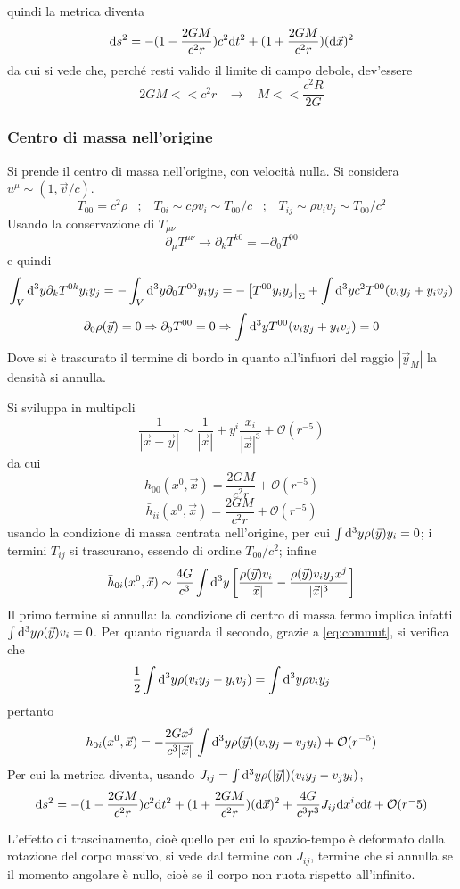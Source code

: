 quindi la metrica diventa
\[ \mathrm{d} s^2 = -(1-\frac{2GM}{c^2r})c^2\mathrm{d} t^2 + (1+\frac{2GM}{c^2r})(\mathrm{d} \vec{x})^2 \]
da cui si vede che, perch\'e resti valido il limite di campo debole, dev'essere
\[ 2GM << c^2r \;\;\;\rightarrow \;\;\; M<<\frac{c^2R}{2G} \]




\subsubsection{Centro di massa nell'origine}
Si prende il centro di massa nell'origine, con velocit\`a nulla. Si considera \( u^\mu \sim (1,\vec{v}/c) \).
\[ T_{00} = c^2\rho \;\;\; ; \;\;\; T_{0i} \sim c\rho v_i \sim T_{00}/c \;\;\; ; \;\;\; T_{ij} \sim \rho v_i v_j\sim T_{00}/c^2 \]
Usando la conservazione di $T_{\mu\nu}$
\[ \partial_\mu T^{\mu\nu} \rightarrow \partial_k T^{k0} = - \partial_0 T^{00} \]
e quindi 
\[ \int_V \mathrm{d}^3y \partial_kT^{0k} y_iy_j = -\int_V \mathrm{d}^3y \partial_0T^{00} y_iy_j  = -\left[ T^{00}y_iy_j\right|_\Sigma + \int \mathrm{d}^3y c^2 T^{00} (v_iy_j + y_iv_j) \]
\begin{equation} \label{eq:commut}
	\partial_0\rho(\vec{y}) = 0 \Rightarrow \partial_0T^{00} = 0 \Rightarrow \int \mathrm{d}^3y T^{00} (v_iy_j + y_iv_j) =0 
\end{equation}
Dove si \`e trascurato il termine di bordo in quanto all'infuori del raggio $|\vec{y}_M|$ la densit\`a si annulla.

Si sviluppa in multipoli
\[ \frac{1}{|\vec{x}-\vec{y}|} \sim \frac{1}{|\vec{x}|} + y^i \frac{x_i}{|\vec{x}|^3} + \mathcal{O}(r^{-5}) \]
da cui
\[ \bar{h}_{00}(x^0,\vec{x}) = \frac{2GM}{c^2 r} + \mathcal{O}(r^{-5}) \]
\[ \bar{h}_{ii}(x^0,\vec{x}) = \frac{2GM}{c^2 r} + \mathcal{O}(r^{-5}) \]
usando la condizione di massa centrata nell'origine, per cui \( \int \mathrm{d}^3y\rho(\vec{y})y_i = 0\); i termini $T_{ij}$ si trascurano, essendo di ordine $T_{00}/c^2$; infine
\[ \bar{h}_{0i}(x^0,\vec{x}) \sim \frac{4G}{c^3} \int \mathrm{d}^3y 
	\left[ 
		\frac{\rho(\vec{y})v_i}{|\vec{x}|}     
	      - \frac{\rho(\vec{y})v_iy_j x^j}{|\vec{x}|^3} 
	\right] \] 
Il primo termine si annulla: la condizione di centro di massa fermo implica infatti \( \int \mathrm{d}^3y\rho(\vec{y})v_i = 0\). Per quanto riguarda il secondo, grazie a \ref{eq:commut}, si verifica che
\[ \frac{1}{2} \int \mathrm{d}^3y \rho (v_iy_j - y_iv_j) = \int \mathrm{d}^3y \rho v_iy_j \]
pertanto
\[ \bar{h}_{0i}(x^0,\vec{x}) = -\frac{2Gx^j}{c^3|\vec{x}|} \int \mathrm{d}^3y \rho(\vec{y}) (v_iy_j - v_jy_i) + \mathcal{O}(r^{-5})  \]
Per cui la metrica diventa, usando \( J_{ij} = \int \mathrm{d}^3y \rho(|\vec{y}|) (v_iy_j - v_jy_i) \),
\[ \mathrm{d} s^2 = -(1 - \frac{2GM}{c^2 r} ) c^2 \mathrm{d} t^2 + (1+\frac{2GM}{c^2 r} ) (\mathrm{d}\vec{x})^2 + \frac{4G}{c^3r^3}J_{ij}\mathrm{d} x^i c \mathrm{d} t + \mathcal{O}(r^-5) \]

L'effetto di trascinamento, cio\`e quello per cui lo spazio-tempo \`e deformato dalla rotazione del corpo massivo, si vede dal termine con $J_{ij}$, termine che si annulla se il momento angolare \`e nullo, cio\`e se il corpo non ruota rispetto all'infinito.
